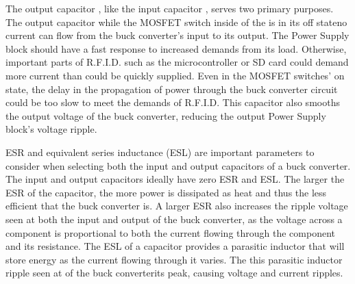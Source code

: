 The output capacitor \DIFaddbegin {}\DIFaddend , like the input capacitor \DIFaddbegin {}\DIFaddend , serves two primary purposes. The output capacitor \DIFdelbegin {}\DIFdelend \DIFaddbegin {}\DIFaddend while the MOSFET switch inside of the \DIFdelbegin {}\DIFdelend \DIFaddbegin {}\DIFaddend is in its off state\DIFdelbegin {}\DIFdelend \DIFaddbegin {}\DIFaddend no current can flow from the buck converter's input to its output. The Power Supply block should have a fast response to increased demands from its load. Otherwise, important parts of R.F.I.D. such as the microcontroller or SD card could demand more current than could be quickly supplied. Even in the MOSFET switches' on state, the delay in the propagation of power through the buck converter circuit could be too slow to meet the demands of R.F.I.D. This capacitor also smooths the output voltage of the buck converter, reducing the output Power Supply block's voltage ripple.  

ESR and equivalent series inductance (ESL) are important parameters to consider when selecting both the input and output capacitors of a buck converter. The input and output capacitors ideally have zero ESR and ESL. The larger the ESR of the capacitor, the more power is dissipated as heat and thus the less efficient that the buck converter is. A larger ESR also increases the ripple voltage seen at both the input and output of the buck converter, as the voltage across a component is proportional to both the current flowing through the component and its resistance. The ESL of a capacitor provides a parasitic inductor that will store energy as the current flowing through it varies. The \DIFdelbegin {}\DIFdelend \DIFaddbegin {}\DIFaddend this parasitic inductor \DIFdelbegin {}\DIFdelend \DIFaddbegin {}\DIFaddend ripple seen at \DIFdelbegin {}\DIFdelend \DIFaddbegin {}\DIFaddend of the buck converter\DIFdelbegin {}\DIFdelend \DIFaddbegin {}\DIFaddend its peak, \DIFaddbegin {}\DIFaddend causing voltage and current ripples.

